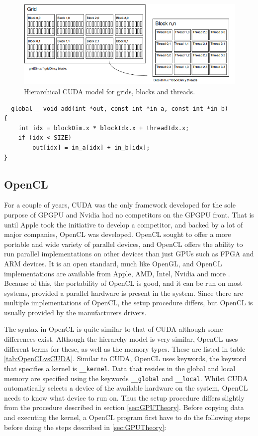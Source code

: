 \begin{figure}[!htpb]
    \centering
    \includegraphics[width=\textwidth]{Theory/Figs/CUDAGridBlockThreads.png}
    \caption{Hierarchical CUDA model for grids, blocks and threads.}
    \label{fig:CUDAGridBlockThreads}
\end{figure}

\begin{lstlisting}[caption={CUDA vector addition kernel}, label={lst:cudaVectorAdd}, frame=single] 
__global__ void add(int *out, const int *in_a, const int *in_b)
{
	int idx = blockDim.x * blockIdx.x + threadIdx.x;
	if (idx < SIZE)
		out[idx] = in_a[idx] + in_b[idx];
}
\end{lstlisting}



\subsection{OpenCL}
For a couple of years, CUDA was the only framework developed for the sole purpose of GPGPU and Nvidia had no competitors on the GPGPU front. That is until Apple took the initiative to develop a competitor, and backed by a lot of major companies, OpenCL was developed. OpenCL sought to offer a more portable and wide variety of parallel devices, and OpenCL offers the ability to run parallel implementations on other devices than just GPUs such as FPGA and ARM devices. It is an open standard, much like OpenGL, and OpenCL implementations are available from Apple, AMD, Intel, Nvidia and more \cite{KhronosOpenCL}. Because of this, the portability of OpenCL is good, and it can be run on most systems, provided a parallel hardware is present in the system. Since there are multiple implementations of OpenCL, the setup procedure differs, but OpenCL is usually provided by the manufacturers drivers.

The syntax in OpenCL is quite similar to that of CUDA although some differences exist. Although the hierarchy model is very similar, OpenCL uses different terms for these, as well as the memory types. These are listed in table \ref{tab:OpenCLvsCUDA}. Similar to CUDA, OpenCL uses keywords, the keyword that specifies a kernel is \lstinline{__kernel}. Data that resides in the global and local memory are specified using the keywords \lstinline{__global} and \lstinline{__local}.
Whilst CUDA automatically selects a device of the available hardware on the system, OpenCL needs to know what device to run on. Thus the setup procedure differs slightly from the procedure described in section \ref{sec:GPUTheory}. Before copying data and executing the kernel, a OpenCL program first have to do the following steps before doing the steps described in \ref{sec:GPUTheory}:

